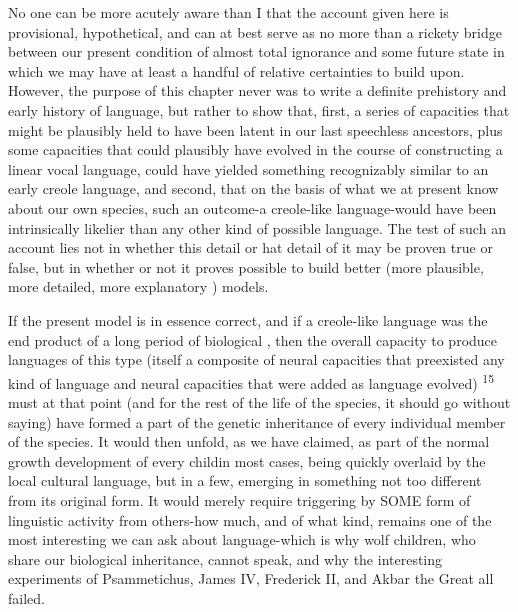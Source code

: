 No one can be more acutely aware than I that the account given here is provisional, hypothetical, and can at best serve as no more than a rickety bridge between our present condition of almost total ignor\-ance and some future state in which we may have at least a handful of relative certainties to build upon. However, the purpose of this chapter never was to write a definite prehistory and early history of language, but rather to show that, first, a series of capacities that might be plausibly held to have been latent in our last speechless ancestors, plus some capacities that could plausibly have evolved in the course of constructing a linear vocal language, could have yielded something recognizably similar to an early creole language, and second, that on the basis of what we at present know about our own species, such an outcome-a creole-like language-would have been intrinsically likelier than any other kind of possible language. The test of such an account lies not in whether this detail or hat detail of it may be proven true
or false, but in whether or not it proves possible to build better (more plausible, more detailed, more explanatory ) models.

If the present model is in essence correct, and if a creole-like language was the end product of a long period of biological , then the overall capacity to produce languages of this type (itself a composite of neural capacities that preexisted any kind of language and neural capacities that were added as language evolved) \textsuperscript{1}\textsuperscript{5} must at that point (and for the rest of the life of the species, it should go without saying) have formed a part of the genetic inheritance of every individual member of the species. It would then unfold, as we have claimed, as part of the normal growth development of every child\-in most cases, being quickly overlaid by the local cultural language, but in a few, emerging in something not too different from its original form. It would merely require triggering by SOME form of linguistic activity from others-how much, and of what kind, remains one of the most interesting  we can ask about language-which is why wolf children, who share our biological inheritance, cannot speak, and why the interesting experiments of Psammetichus, James IV, Frederick II, and Akbar the Great all failed.

